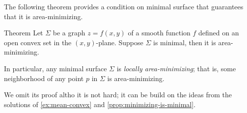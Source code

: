 The following theorem provides a condition on minimal surface that guarantees that it is area-minimizing.

\begin{thm}{Theorem}
Let $\Sigma$ be a graph $z=f(x,y)$ of a smooth function $f$ defined on an open convex set in the $(x,y)$-plane.
Suppose $\Sigma$ is minimal, then it is area-minimizing.

In particular, any minimal surface $\Sigma$ is \emph{locally area-minimizing};
that is, some neighborhood of any point $p$ in $\Sigma$ is area-minimizing.
\end{thm}

We omit its proof altho it is not hard;
it can be build on the ideas from the solutions of \ref{ex:mean-convex} and \ref{prop:minimizing-is-minimal}.

